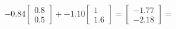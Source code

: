 \documentclass[preview]{standalone}
\begin{document}
\begin{align*}
-0.84 \begin{bmatrix} 0.8 \\ 0.5 \end{bmatrix} + -1.10 \begin{bmatrix} 1 \\ 1.6 \end{bmatrix} = \begin{bmatrix} -1.77 \\ -2.18 \end{bmatrix} =
\end{align*}
\end{document}
